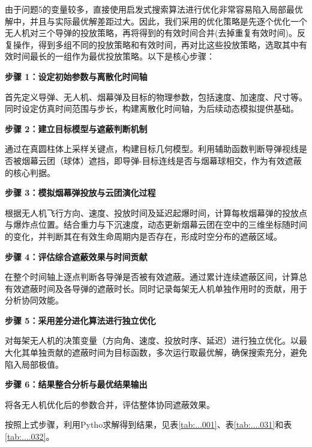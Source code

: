 \documentclass[../main.tex]{subfiles}
\begin{document}

由于问题5的变量较多，直接使用启发式搜索算法进行优化非常容易陷入局部最优解中，并且与实际最优解差距过大。因此，我们采用的优化策略是先逐个优化一个无人机对三个导弹的投放策略，再将得到的有效时间合并(去掉重复有效时间)。反复操作，得到多组不同的投放策略和有效时间，再对比这些投放策略，选取其中有效时间最长的一组作为最优投放策略。以下是核心步骤：

\noindent \textbf{步骤 1：设定初始参数与离散化时间轴}

首先定义导弹、无人机、烟幕弹及目标的物理参数，包括速度、加速度、尺寸等。同时设定仿真时间范围与步长，构建离散化时间轴，为后续动态模拟提供基础。

\noindent \textbf{步骤 2：建立目标模型与遮蔽判断机制} 

通过在真圆柱体上采样关键点，构建目标几何模型。利用辅助函数判断导弹视线是否被烟幕云团（球体）遮挡，即导弹-目标连线是否与烟幕球相交，作为有效遮蔽的核心判据。

\noindent \textbf{步骤 3：模拟烟幕弹投放与云团演化过程} 

根据无人机飞行方向、速度、投放时间及延迟起爆时间，计算每枚烟幕弹的投放点与爆炸点位置。结合重力与下沉速度，动态更新烟幕云团在空中的三维坐标随时间的变化，并判断其在有效生命周期内是否存在，形成时空分布的遮蔽区域。

\noindent \textbf{步骤 4：评估综合遮蔽效果与时间贡献} 

在整个时间轴上逐点判断各导弹是否被有效遮蔽。通过累计连续遮蔽区间，计算总有效遮蔽时间及各导弹的遮蔽时长。同时记录每架无人机单独作用时的贡献，用于分析协同效能。

\noindent \textbf{步骤 5：采用差分进化算法进行独立优化} 

对每架无人机的决策变量（方向角、速度、投放时序、延迟）进行独立优化。以最大化其单独贡献的遮蔽时间为目标函数，多次运行取最优解，确保搜索充分，避免陷入局部极值。

\noindent \textbf{步骤 6：结果整合分析与最优结果输出} 

将各无人机优化后的参数合并，评估整体协同遮蔽效果。

按照上式步骤，利用Pytho求解得到结果，见表\ref{tab:...001}、表\ref{tab:....031}和表\ref{tab:....032}。
\end{document}
